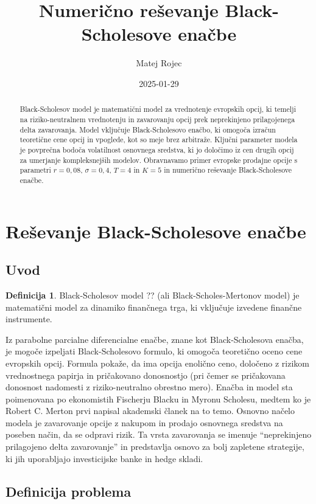 \documentclass{article}
\title{Numerično reševanje Black-Scholesove enačbe}
\author{Matej Rojec}
\date{2025-01-29}
\theoremstyle{definition}
\newtheorem{definicija}{Definicija}
\begin{document}
\begin{abstract}
    Black-Scholesov model je matematični model za vrednotenje evropskih opcij, ki temelji na riziko-neutralnem vrednotenju in zavarovanju opcij prek neprekinjeno prilagojenega delta zavarovanja. Model vključuje Black-Scholesovo enačbo, ki omogoča izračun teoretične cene opcij in vpoglede, kot so meje brez arbitraže. Ključni parameter modela je povprečna bodoča volatilnost osnovnega sredstva, ki jo določimo iz cen drugih opcij za umerjanje kompleksnejših modelov.
    Obravnavamo primer evropske prodajne opcije s parametri $r = 0,08$, $\sigma = 0,4$, $T = 4$ in $K = 5$ in numerično reševanje Black-Scholesove enačbe.
\end{abstract}

\section{Reševanje Black-Scholesove enačbe}

\subsection{Uvod}

\begin{definicija}
Black-Scholesov model ?? (ali Black-Scholes-Mertonov model) je matematični model za dinamiko finančnega trga, ki vključuje izvedene finančne instrumente. 
\end{definicija}

Iz parabolne parcialne diferencialne enačbe, znane kot Black-Scholesova enačba, je mogoče izpeljati Black-Scholesovo formulo, ki omogoča teoretično oceno cene evropskih opcij. Formula pokaže, da ima opcija enolično ceno, določeno z rizikom vrednostnega papirja in pričakovano donosnostjo (pri čemer se pričakovana donosnost nadomesti z riziko-neutralno obrestno mero). Enačba in model sta poimenovana po ekonomistih Fischerju Blacku in Myronu Scholesu, medtem ko je Robert C. Merton prvi napisal akademski članek na to temo.
Osnovno načelo modela je zavarovanje opcije z nakupom in prodajo osnovnega sredstva na poseben način, da se odpravi rizik. Ta vrsta zavarovanja se imenuje “neprekinjeno prilagojeno delta zavarovanje” in predstavlja osnovo za bolj zapletene strategije, ki jih uporabljajo investicijske banke in hedge skladi.


\subsection{Definicija problema}
\end{document}
